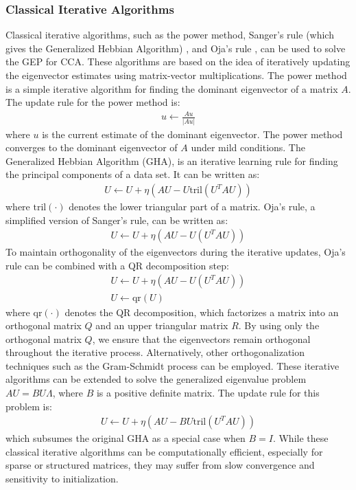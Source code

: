 \subsubsection{Classical Iterative Algorithms}
Classical iterative algorithms, such as the power method, Sanger's rule (which gives the Generalized Hebbian Algorithm) \citep{sanger1989optimal}, and Oja's rule \citep{oja1982simplified}, can be used to solve the GEP for CCA. These algorithms are based on the idea of iteratively updating the eigenvector estimates using matrix-vector multiplications.
The power method is a simple iterative algorithm for finding the dominant eigenvector of a matrix $A$. The update rule for the power method is:
\begin{align}
u \leftarrow \frac{A u}{|A u|}
\end{align}
where $u$ is the current estimate of the dominant eigenvector. The power method converges to the dominant eigenvector of $A$ under mild conditions.
The Generalized Hebbian Algorithm (GHA), is an iterative learning rule for finding the principal components of a data set. It can be written as:
\begin{align}
U \leftarrow U + \eta \left( A U - U \text{tril}(U^T A U) \right)
\end{align}
where $\text{tril}(\cdot)$ denotes the lower triangular part of a matrix.
Oja's rule, a simplified version of Sanger's rule, can be written as:
\begin{align}
U \leftarrow U + \eta \left( A U - U (U^T A U) \right)
\end{align}
To maintain orthogonality of the eigenvectors during the iterative updates, Oja's rule can be combined with a QR decomposition step:
\begin{align}
U \leftarrow U + \eta \left( A U - U (U^T A U) \right) \\
U \leftarrow \text{qr}(U)
\end{align}
where $\text{qr}(\cdot)$ denotes the QR decomposition, which factorizes a matrix into an orthogonal matrix $Q$ and an upper triangular matrix $R$. By using only the orthogonal matrix $Q$, we ensure that the eigenvectors remain orthogonal throughout the iterative process. Alternatively, other orthogonalization techniques such as the Gram-Schmidt process can be employed.
These iterative algorithms can be extended to solve the generalized eigenvalue problem $A U = B U \Lambda$, where $B$ is a positive definite matrix. The update rule for this problem is:
\begin{align}
U \leftarrow U + \eta \left( A U - B U \text{tril}(U^T A U) \right)
\end{align}
which subsumes the original GHA as a special case when $B=I$.
While these classical iterative algorithms can be computationally efficient, especially for sparse or structured matrices, they may suffer from slow convergence and sensitivity to initialization.

